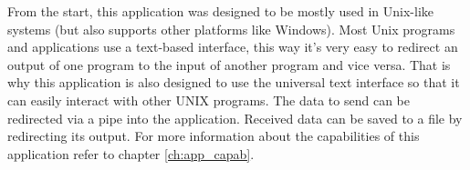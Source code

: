 From the start, this application was designed to be mostly used in Unix-like systems (but also supports other platforms like Windows). Most Unix programs and applications use a text-based interface, this way it's very easy to redirect an output of one program to the input of another program and vice versa. That is why this application is also designed to use the universal text interface so that it can easily interact with other UNIX programs. The data to send can be redirected via a pipe into the application. Received data can be saved to a file by redirecting its output. For more information about the capabilities of this application refer to chapter \ref{ch:app_capab}.
